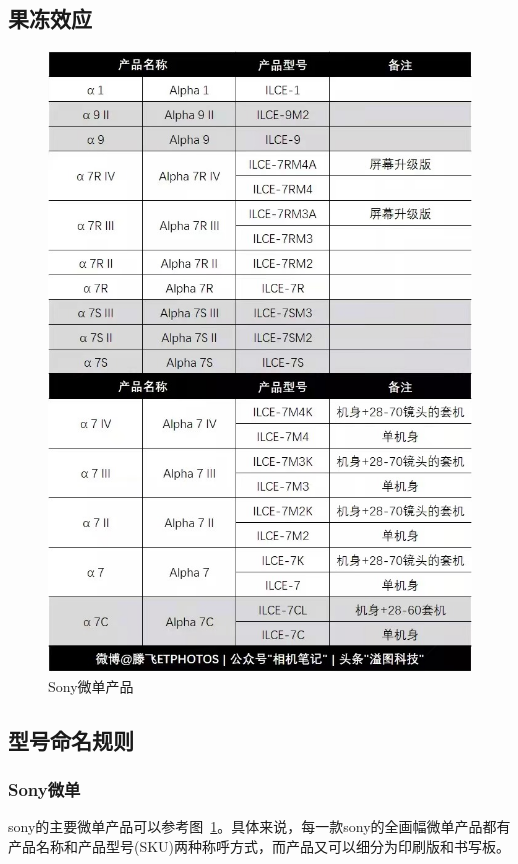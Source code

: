 \documentclass{ctexart}
\begin{document}
\subsection{果冻效应}


\begin{figure}[h!]
    \centering
    \includegraphics[width=.7\linewidth]{imgs/sony_product.jpeg}
    \caption{Sony微单产品}
    \label{fig_sony_products}
\end{figure}

\subsection{型号命名规则}

\subsubsection{Sony微单~\cite{sony_products_analysis}}
sony的主要微单产品可以参考图~\ref{fig_sony_products}。具体来说，每一款sony的全画幅微单产品都有产品名称和产品型号(SKU)两种称呼方式，而产品又可以细分为印刷版和书写板。
\end{document}
